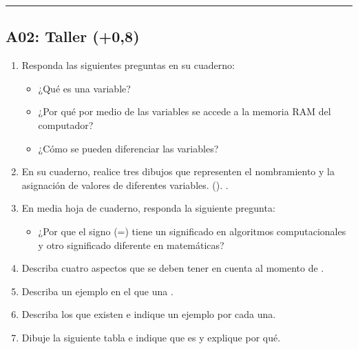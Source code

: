 \documentclass[letterpaper,10pt,spanish]{sphinxmanual}
\begin{document}
\bigskip\hrule\bigskip



\subsection{A02: Taller (+0,8)}
\label{\detokenize{1_guias/10programacion/G1025:a02-taller-0-8}}
\sphinxAtStartPar
{}
\begin{enumerate}
%
\item {} 
\sphinxAtStartPar
Responda las siguientes preguntas en su cuaderno:
\begin{itemize}
\item {} 
\sphinxAtStartPar
¿Qué es una variable?

\item {} 
\sphinxAtStartPar
¿Por qué por medio de las variables se accede a la memoria RAM del computador?

\item {} 
\sphinxAtStartPar
¿Cómo se pueden diferenciar las variables?

\end{itemize}

\item {} 
\sphinxAtStartPar
En su cuaderno, realice tres dibujos que representen el nombramiento y la asignación de valores de diferentes variables. (). .

\item {} 
\sphinxAtStartPar
En media hoja de cuaderno, responda la siguiente pregunta:
\begin{itemize}
\item {} 
\sphinxAtStartPar
¿Por que el signo (=) tiene un significado en algoritmos computacionales y otro significado diferente en matemáticas?

\end{itemize}

\item {} 
\sphinxAtStartPar
Describa cuatro aspectos que se deben tener en cuenta al momento de .

\item {} 
\sphinxAtStartPar
Describa un ejemplo en el que una .

\item {} 
\sphinxAtStartPar
Describa los  que existen e indique un ejemplo por cada una.

\item {} 
\sphinxAtStartPar
Dibuje la siguiente tabla e indique que  es y explique por qué.

\end{enumerate}
\end{document}
